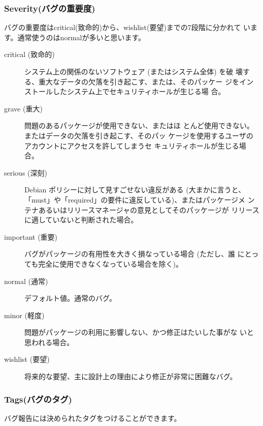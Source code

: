 \documentclass[mingoth,a4paper]{jsarticle}
\begin{document}
\subsubsection{Severity(バグの重要度)}
バグの重要度はcritical(致命的)から、wishlist(要望)までの7段階に分かれて
います。通常使うのはnormalが多いと思います。


\begin{description}
 \item[critical (致命的)]

            システム上の関係のないソフトウェア (またはシステム全体) を破
            壊する、重大なデータの欠落を引き起こす、または、そのパッケー
            ジをインストールしたシステム上でセキュリティホールが生じる場
            合。

 \item[grave (重大)]

            問題のあるパッケージが使用できない、またはほ
            とんど使用できない。またはデータの欠落を引き起こす、そのパッ
            ケージを使用するユーザのアカウントにアクセスを許してしまうセ
            キュリティホールが生じる場合。

 \item[serious (深刻)]

            Debian ポリシーに対して見すごせない違反がある (大まかに言うと、
            「must」や「required」の要件に違反している)、またはパッケージメ
            ンテナあるいはリリースマネージャの意見としてそのパッケージが
            リリースに適していないと判断された場合。

 \item[important (重要)]

            バグがパッケージの有用性を大きく損なっている場合 (ただし、誰
            にとっても完全に使用できなくなっている場合を除く)。

 \item[normal (通常)]
            デフォルト値。通常のバグ。

 \item[minor (軽度)]

            問題がパッケージの利用に影響しない、かつ修正はたいした事がな
            いと思われる場合。

 \item[wishlist (要望)]

            将来的な要望、主に設計上の理由により修正が非常に困難なバグ。
\end{description}


\subsubsection{Tags(バグのタグ)}
バグ報告には決められたタグをつけることができます。
\end{document}
